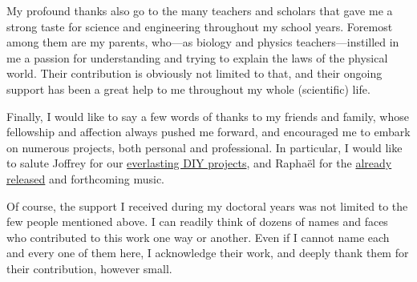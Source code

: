 My profound thanks also go to the many teachers and scholars that gave me a strong taste for science and engineering throughout my school years. Foremost among them are my parents, who---as biology and physics teachers---instilled in me a passion for understanding and trying to explain the laws of the physical world. Their contribution is obviously not limited to that, and their ongoing support has been a great help to me throughout my whole (scientific) life.

Finally, I would like to say a few words of thanks to my friends and family, whose fellowship and affection always pushed me forward, and encouraged me to embark on numerous projects, both personal and professional. In particular, I would like to salute Joffrey for our \href{https://www.youtube.com/watch?v=zowdYJ5vWB0}{everlasting DIY projects}, and Raphaël for the \href{https://esoteroots.bandcamp.com/}{already released} and forthcoming music.

Of course, the support I received during my doctoral years was not limited to the few people mentioned above. I can readily think of dozens of names and faces who contributed to this work one way or another. Even if I cannot name each and every one of them here, I acknowledge their work, and deeply thank them for their contribution, however small.
















